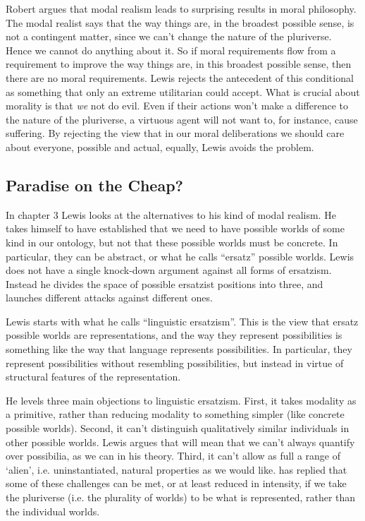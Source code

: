 Robert \citet{Adams1974} argues that modal realism leads to surprising results in moral philosophy. The modal realist says that the way things are, in the broadest possible sense, is not a contingent matter, since we can't change the nature of the pluriverse. Hence we cannot do anything about it. So if moral requirements flow from a requirement to improve the way things are, in this broadest possible sense, then there are no moral requirements. Lewis rejects the antecedent of this conditional as something that only an extreme utilitarian could accept. What is crucial about morality is that \textit{we} not do evil. Even if their actions won't make a difference to the nature of the pluriverse, a virtuous agent will not want to, for instance, cause suffering. By rejecting the view that in our moral deliberations we should care about everyone, possible and actual, equally, Lewis avoids the problem.

\subsection{Paradise on the Cheap?} 

In chapter 3 Lewis looks at the alternatives to his kind of modal realism. He takes himself to have established that we need to have possible worlds of some kind in our ontology, but not that these possible worlds must be concrete. In particular, they can be abstract, or what he calls ``ersatz'' possible worlds. Lewis does not have a single knock-down argument against all forms of ersatzism. Instead he divides the space of possible ersatzist positions into three, and launches different attacks against different ones.

Lewis starts with what he calls ``linguistic ersatzism''. This is the view that ersatz possible worlds are representations, and the way they represent possibilities is something like the way that language represents possibilities. In particular, they represent possibilities without resembling possibilities, but instead in virtue of structural features of the representation.

He levels three main objections to linguistic ersatzism. First, it takes modality as a primitive, rather than reducing modality to something simpler (like concrete possible worlds). Second, it can't distinguish qualitatively similar individuals in other possible worlds. Lewis argues that will mean that we can't always quantify over possibilia, as we can in his theory. Third, it can't allow as full a range of `alien', i.e. uninstantiated, natural properties as we would like. \citet{Sider2002-SIDTEP} has replied that some of these challenges can be met, or at least reduced in intensity, if we take the pluriverse (i.e. the plurality of worlds) to be what is represented, rather than the individual worlds.

